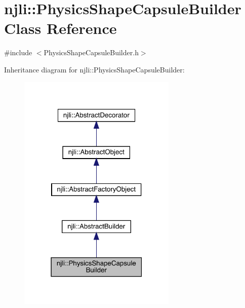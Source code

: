 \hypertarget{classnjli_1_1_physics_shape_capsule_builder}{}\section{njli\+:\+:Physics\+Shape\+Capsule\+Builder Class Reference}
\label{classnjli_1_1_physics_shape_capsule_builder}


{\ttfamily \#include $<$Physics\+Shape\+Capsule\+Builder.\+h$>$}



Inheritance diagram for njli\+:\+:Physics\+Shape\+Capsule\+Builder\+:\nopagebreak
\begin{figure}[H]
\begin{center}
\leavevmode
\includegraphics[width=214pt]{classnjli_1_1_physics_shape_capsule_builder__inherit__graph}
\end{center}
\end{figure}


